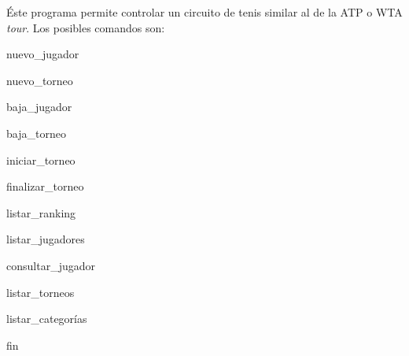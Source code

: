 Éste programa permite controlar un circuito de tenis similar al de la ATP o WTA {\itshape tour}. Los posibles comandos son\+:
\begin{DoxyEnumerate}
\item nuevo\+\_\+jugador
\item nuevo\+\_\+torneo
\item baja\+\_\+jugador
\item baja\+\_\+torneo
\item iniciar\+\_\+torneo
\item finalizar\+\_\+torneo
\item listar\+\_\+ranking
\item listar\+\_\+jugadores
\item consultar\+\_\+jugador
\item listar\+\_\+torneos
\item listar\+\_\+categorías
\item fin 
\end{DoxyEnumerate}